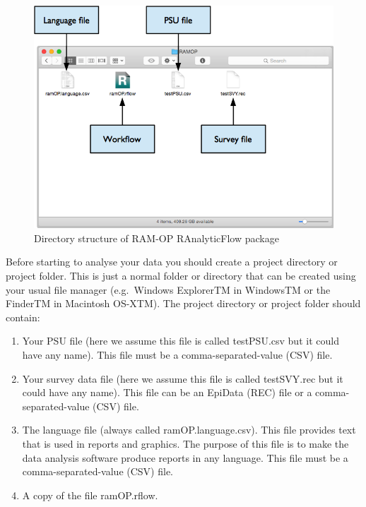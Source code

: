 \documentclass[12pt,]{book}
\theoremstyle{definition}
\theoremstyle{definition}
\theoremstyle{definition}
\theoremstyle{remark}
\begin{document}
\begin{figure}

{\centering \includegraphics[width=9.75in]{figures/dirStructureRAF} 

}

\caption{Directory structure of RAM-OP RAnalyticFlow package}\label{fig:raf1}
\end{figure}

Before starting to analyse your data you should create a project
directory or project folder. This is just a normal folder or directory
that can be created using your usual file manager (e.g.~Windows
ExplorerTM in WindowsTM or the FinderTM in Macintosh OS-XTM). The
project directory or project folder should contain:

\begin{enumerate}
\def\labelenumi{\arabic{enumi}.}
\item
  Your PSU file (here we assume this file is called testPSU.csv but it
  could have any name). This file must be a comma-separated-value (CSV)
  file.
\item
  Your survey data file (here we assume this file is called testSVY.rec
  but it could have any name). This file can be an EpiData (REC) file or
  a comma-separated-value (CSV) file.
\item
  The language file (always called ramOP.language.csv). This file
  provides text that is used in reports and graphics. The purpose of
  this file is to make the data analysis software produce reports in any
  language. This file must be a comma-separated-value (CSV) file.
\item
  A copy of the file ramOP.rflow.
\end{enumerate}
\end{document}
